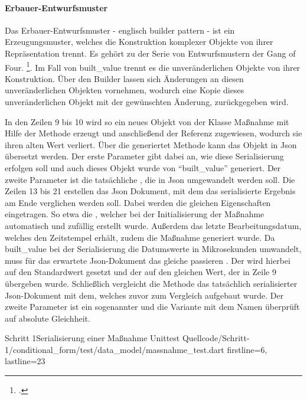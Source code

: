 \paragraph{Erbauer-Entwurfsmuster} Das Erbauer-Entwurfsmuster - englisch builder pattern - ist ein Erzeugungsmuster, welches die Konstruktion komplexer Objekte von ihrer Repräsentation trennt. Es gehört zu der Serie von Entwurfsmustern der Gang of Four. \footcite[Vgl.][S. 119]{gamma2009entwurfsmuster}. Im Fall von built_value trennt es die unveränderlichen Objekte von ihrer Konstruktion. Über den Builder lassen sich Änderungen an diesen unveränderlichen Objekten vornehmen, wodurch eine Kopie dieses unveränderlichen Objekt mit der gewünschten Änderung, zurückgegeben wird.

In den Zeilen 9 bis 10 wird so ein neues Objekt von der Klasse Maßnahme mit Hilfe der Methode  erzeugt und anschließend der Referenz  zugewiesen, wodurch sie ihren alten Wert verliert. Über die generiertet Methode   kann das Objekt in Json übersetzt werden. Der erste Parameter  gibt dabei an, wie diese Serialisierung erfolgen soll und auch dieses Objekt wurde von \enquote{built_value} generiert. Der zweite Parameter ist die tatsächliche , die in Json umgewandelt werden soll. Die Zeilen 13 bis 21 erstellen das Json Dokument, mit dem das serialisierte Ergebnis am Ende verglichen werden soll. Dabei werden die gleichen Eigenschaften eingetragen. So etwa die , welcher bei der Initialisierung der Maßnahme automatisch und zufällig erstellt wurde. Außerdem das letzte Bearbeitungsdatum, welches den Zeitstempel erhält, zudem die Maßnahme generiert wurde. Da built_value bei der Serialisierung die Datumswerte in Mikrosekunden umwandelt, muss für das erwartete Json-Dokument das gleiche passieren . Der   wird hierbei auf den Standardwert  gesetzt und der   auf den gleichen Wert, der in Zeile 9 übergeben wurde. 
Schließlich vergleicht die Methode  das tatsächlich serialisierter Json-Dokument mit dem, welches zuvor zum Vergleich aufgebaut wurde. Der zweite Parameter ist ein sogenannter  und die Variante mit dem Namen  überprüft auf absolute Gleichheit. 

\begin{alexlisting}{Schritt 1}{Serialisierung einer Maßnahme Unittest}
  {Quellcode/Schritt-1/conditional_form/test/data_model/massnahme_test.dart}
  {firstline=6, lastline=23}
  \label{lst:SerialisierungEinerMassnahmeUnittest}
\end{alexlisting}

